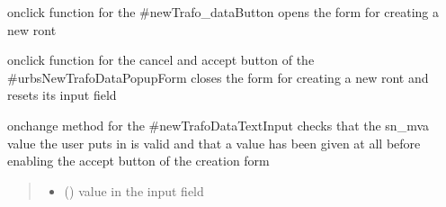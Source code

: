 \documentclass[letterpaper,10pt,english]{sphinxmanual}
\begin{document}

\begin{fulllineitems}
\label{\detokenize{docs_gui/js_api/urbs_editor/transmission_editor:openNewTrafoDataForm}}
\pysigstartsignatures
{}
\pysigstopsignatures
\sphinxAtStartPar
onclick function for the \#newTrafo\_dataButton
opens the form for creating a new ront

\end{fulllineitems}


\begin{fulllineitems}
\label{\detokenize{docs_gui/js_api/urbs_editor/transmission_editor:closeNewTrafoDataForm}}
\pysigstartsignatures
{}
\pysigstopsignatures
\sphinxAtStartPar
onclick function for the cancel and accept button of the \#urbsNewTrafoDataPopupForm
closes the form for creating a new ront and resets its input field

\end{fulllineitems}


\begin{fulllineitems}
\label{\detokenize{docs_gui/js_api/urbs_editor/transmission_editor:trafoDataFormCheckValidInput}}
\pysigstartsignatures
{}
\pysigstopsignatures
\sphinxAtStartPar
onchange method for the \#newTrafoDataTextInput
checks that the sn\_mva value the user puts in is valid and that a value has been given at all before
enabling the accept button of the creation form
\begin{quote}\begin{description}
\begin{itemize}
\item {} 
\sphinxAtStartPar
{} () \textendash{} value in the input field

\end{itemize}

\end{description}\end{quote}

\end{fulllineitems}
\end{document}
